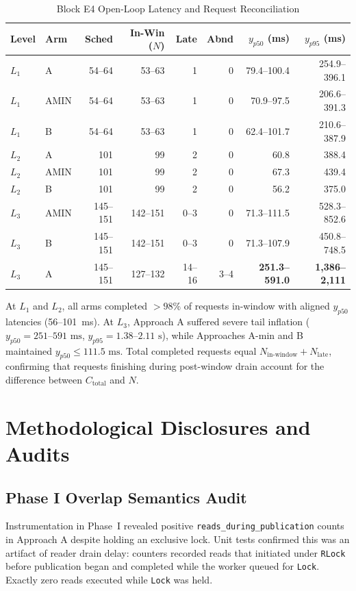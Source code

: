 \documentclass[conference]{IEEEtran}
\begin{document}
\begin{table}[h]
\caption{Block E4 Open-Loop Latency and Request Reconciliation}
\label{tab:e4_reconciliation}
\centering
\footnotesize
\setlength{\tabcolsep}{3pt}
\begin{tabular}{@{}llrrrrrr@{}}
\toprule
\textbf{Level} & \textbf{Arm} & \textbf{Sched} & \textbf{In-Win ($N$)} & \textbf{Late} & \textbf{Abnd} & \textbf{$y_{p50}$ (ms)} & \textbf{$y_{p95}$ (ms)} \\
\midrule
$L_1$ & A & 54--64 & 53--63 & 1 & 0 & 79.4--100.4 & 254.9--396.1 \\
$L_1$ & AMIN & 54--64 & 53--63 & 1 & 0 & 70.9--97.5 & 206.6--391.3 \\
$L_1$ & B & 54--64 & 53--63 & 1 & 0 & 62.4--101.7 & 210.6--387.9 \\
\midrule
$L_2$ & A & 101 & 99 & 2 & 0 & 60.8 & 388.4 \\
$L_2$ & AMIN & 101 & 99 & 2 & 0 & 67.3 & 439.4 \\
$L_2$ & B & 101 & 99 & 2 & 0 & 56.2 & 375.0 \\
\midrule
$L_3$ & AMIN & 145--151 & 142--151 & 0--3 & 0 & 71.3--111.5 & 528.3--852.6 \\
$L_3$ & B & 145--151 & 142--151 & 0--3 & 0 & 71.3--107.9 & 450.8--748.5 \\
$L_3$ & A & 145--151 & 127--132 & 14--16 & 3--4 & \textbf{251.3--591.0} & \textbf{1,386--2,111} \\
\bottomrule
\end{tabular}
\end{table}

At $L_1$ and $L_2$, all arms completed $>98\%$ of requests in-window with aligned $y_{p50}$ latencies (56--101~ms). At $L_3$, Approach A suffered severe tail inflation ($y_{p50} = 251\text{--}591\text{ ms}$, $y_{p95} = 1.38\text{--}2.11\text{ s}$), while Approaches A-min and B maintained $y_{p50} \le 111.5\text{ ms}$. Total completed requests equal $N_{\text{in-window}} + N_{\text{late}}$, confirming that requests finishing during post-window drain account for the difference between $C_{\text{total}}$ and $N$.

\section{Methodological Disclosures and Audits}

\subsection{Phase I Overlap Semantics Audit}
Instrumentation in Phase~I revealed positive \texttt{reads\_during\_publication} counts in Approach A despite holding an exclusive lock. Unit tests confirmed this was an artifact of reader drain delay: counters recorded reads that initiated under \texttt{RLock} before publication began and completed while the worker queued for \texttt{Lock}. Exactly zero reads executed while \texttt{Lock} was held.
\end{document}
